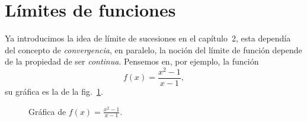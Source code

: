 \documentclass[11pt,oneside,a4paper]{book}
\begin{document}
\section{Límites de funciones}
Ya introducimos la idea de límite de sucesiones en el capítulo~2, esta dependía del concepto de \textit{convergencia}, en paralelo, la noción del límite de función depende de la propiedad de ser \textit{continua}. Pensemos en, por ejemplo, la función
$$f(x)=\frac{x^2-1}{x-1},$$
su gráfica es la de la fig.~\ref{fig:generic-limits-example}.
\begin{figure}
\centering
{}
\caption{Gráfica de $f(x)=\frac{x^2-1}{x-1}$.}
\label{fig:generic-limits-example}
\end{figure}
\end{document}
